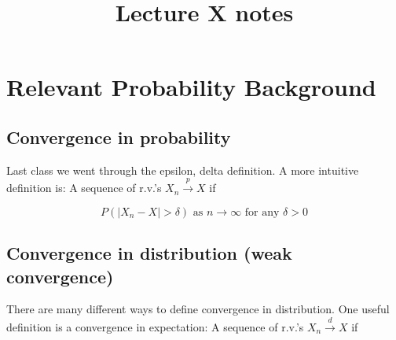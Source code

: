 \documentclass[aos,preprint]{imsart}
\numberwithin{equation}{section}
\theoremstyle{plain}
\begin{document}
\begin{frontmatter}

\title{Lecture X notes}

\address{Scribe 1 \\ Scribe 2 \\ Scribe 3 \\ Scribe 3 \\ \today}






\end{frontmatter}


\section{Relevant Probability Background}

\subsection{Convergence in probability}
Last class we went through the epsilon, delta definition. A more intuitive definition is: A sequence of r.v.'s ${{X_n}} \xrightarrow{p} X $ if 

$$ P(|X_n - X | > \delta) \text{ as } n \rightarrow \infty \text{ for any } \delta>0 $$

\subsection{Convergence in distribution (weak convergence)}
There are many different ways to define convergence in distribution. One useful definition is a convergence in expectation: A sequence of r.v.'s ${{X_n}} \xrightarrow{d} X $ if 
\end{document}

